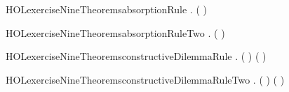 \newcommand{\HOLexerciseNineDate}{26 February 2019}
\newcommand{\HOLexerciseNineTime}{20:51}
\begin{SaveVerbatim}{HOLexerciseNineTheoremsabsorptionRule}
\HOLTokenTurnstile{} \HOLSymConst{\HOLTokenForall{}} . ( \HOLSymConst{\HOLTokenImp{}} ) \HOLSymConst{\HOLTokenImp{}}  \HOLSymConst{\HOLTokenImp{}}  \HOLSymConst{\HOLTokenConj{}} 
\end{SaveVerbatim}
\newcommand{\HOLexerciseNineTheoremsabsorptionRule}{\UseVerbatim{HOLexerciseNineTheoremsabsorptionRule}}
\begin{SaveVerbatim}{HOLexerciseNineTheoremsabsorptionRuleTwo}
\HOLTokenTurnstile{} \HOLSymConst{\HOLTokenForall{}} . ( \HOLSymConst{\HOLTokenImp{}} ) \HOLSymConst{\HOLTokenImp{}}  \HOLSymConst{\HOLTokenImp{}}  \HOLSymConst{\HOLTokenConj{}} 
\end{SaveVerbatim}
\newcommand{\HOLexerciseNineTheoremsabsorptionRuleTwo}{\UseVerbatim{HOLexerciseNineTheoremsabsorptionRuleTwo}}
\begin{SaveVerbatim}{HOLexerciseNineTheoremsconstructiveDilemmaRule}
\HOLTokenTurnstile{} \HOLSymConst{\HOLTokenForall{}}   . ( \HOLSymConst{\HOLTokenImp{}} ) \HOLSymConst{\HOLTokenConj{}} ( \HOLSymConst{\HOLTokenImp{}} ) \HOLSymConst{\HOLTokenImp{}}  \HOLSymConst{\HOLTokenDisj{}}  \HOLSymConst{\HOLTokenImp{}}  \HOLSymConst{\HOLTokenDisj{}} 
\end{SaveVerbatim}
\newcommand{\HOLexerciseNineTheoremsconstructiveDilemmaRule}{\UseVerbatim{HOLexerciseNineTheoremsconstructiveDilemmaRule}}
\begin{SaveVerbatim}{HOLexerciseNineTheoremsconstructiveDilemmaRuleTwo}
\HOLTokenTurnstile{} \HOLSymConst{\HOLTokenForall{}}   . ( \HOLSymConst{\HOLTokenImp{}} ) \HOLSymConst{\HOLTokenConj{}} ( \HOLSymConst{\HOLTokenImp{}} ) \HOLSymConst{\HOLTokenImp{}}  \HOLSymConst{\HOLTokenDisj{}}  \HOLSymConst{\HOLTokenImp{}}  \HOLSymConst{\HOLTokenDisj{}} 
\end{SaveVerbatim}
\newcommand{\HOLexerciseNineTheoremsconstructiveDilemmaRuleTwo}{\UseVerbatim{HOLexerciseNineTheoremsconstructiveDilemmaRuleTwo}}
\newcommand{\HOLexerciseNineTheorems}{
\HOLThmTag{exercise9}{absorptionRule}\HOLexerciseNineTheoremsabsorptionRule
\HOLThmTag{exercise9}{absorptionRule2}\HOLexerciseNineTheoremsabsorptionRuleTwo
\HOLThmTag{exercise9}{constructiveDilemmaRule}\HOLexerciseNineTheoremsconstructiveDilemmaRule
\HOLThmTag{exercise9}{constructiveDilemmaRule2}\HOLexerciseNineTheoremsconstructiveDilemmaRuleTwo
}
